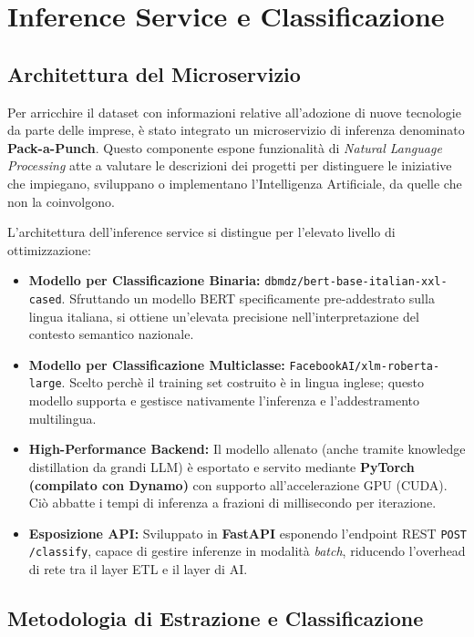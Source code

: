 \chapter{Inference Service e Classificazione}

\section{Architettura del Microservizio}

Per arricchire il dataset con informazioni relative all'adozione di nuove tecnologie da parte delle imprese, è stato integrato un microservizio di inferenza denominato \textbf{Pack-a-Punch}. Questo componente espone funzionalità di \textit{Natural Language Processing} atte a valutare le descrizioni dei progetti per distinguere le iniziative che impiegano, sviluppano o implementano l'Intelligenza Artificiale, da quelle che non la coinvolgono.

L'architettura dell'inference service si distingue per l'elevato livello di ottimizzazione:
\begin{itemize}
    \item \textbf{Modello per Classificazione Binaria:} \texttt{dbmdz/bert-base-italian-xxl-cased}. Sfruttando un modello BERT specificamente pre-addestrato sulla lingua italiana, si ottiene un'elevata precisione nell'interpretazione del contesto semantico nazionale.
    \item \textbf{Modello per Classificazione Multiclasse:} \texttt{FacebookAI/xlm-roberta-large}. Scelto perchè il training set costruito è in lingua inglese; questo modello supporta e gestisce nativamente l'inferenza e l'addestramento multilingua.
    \item \textbf{High-Performance Backend:} Il modello allenato (anche tramite knowledge distillation da grandi LLM) è esportato e servito mediante \textbf{PyTorch (compilato con Dynamo)} con supporto all'accelerazione GPU (CUDA). Ciò abbatte i tempi di inferenza a frazioni di millisecondo per iterazione.
    \item \textbf{Esposizione API:} Sviluppato in \textbf{FastAPI} esponendo l'endpoint REST \texttt{POST /classify}, capace di gestire inferenze in modalità \textit{batch}, riducendo l'overhead di rete tra il layer ETL e il layer di AI.
\end{itemize}

\section{Metodologia di Estrazione e Classificazione}

